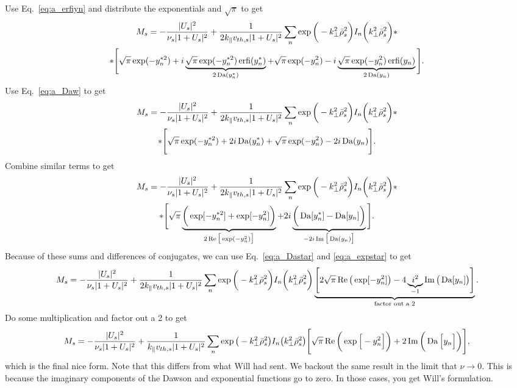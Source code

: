 Use Eq.~\ref{eq:a_erfiyn} and distribute the exponentials and $\sqrt{\pi}$ to get
\begin{multline}
	M_s = -\frac{|U_s|^2}{\nu_s|1+U_s|^2}
	+ \frac{1}{2 k_\parallel v_{th,s}|1+U_s|^2}  \sum_n
	\exp\bigg( - k_\perp^2 \bar{\rho}_s^2  \bigg)
	I_n\bigg( k_\perp^2 \bar{\rho}_s^2 \bigg)* \\
	* \Bigg[
	\sqrt{\pi}\exp ( -y_n^{*2})+i \underbrace{ \sqrt{\pi}\exp ( -y_n^{*2}) \operatorname{erfi}(y_n^*)}_{2 \operatorname{Da}(y_n^*)}
	+ 	\sqrt{\pi}\exp ( -y_n^{2})-i \underbrace{\sqrt{\pi}\exp ( -y_n^{2})\operatorname{erfi}(y_n) }_{2 \operatorname{Da}(y_n)}
	\Bigg].
\end{multline}
Use Eq.~\ref{eq:a_Daw} to get
\begin{multline}
	M_s = -\frac{|U_s|^2}{\nu_s|1+U_s|^2}
	+ \frac{1}{2 k_\parallel v_{th,s}|1+U_s|^2}  \sum_n
	\exp\bigg( - k_\perp^2 \bar{\rho}_s^2  \bigg)
	I_n\bigg( k_\perp^2 \bar{\rho}_s^2 \bigg)* \\
	* \Bigg[
	\sqrt{\pi}\exp ( -y_n^{*2})+ 2 i\operatorname{Da}(y_n^*)
	+ 	\sqrt{\pi}\exp ( -y_n^{2})- 2 i\operatorname{Da}(y_n)
	\Bigg].
\end{multline}
Combine similar terms to get
\begin{multline}
	M_s = -\frac{|U_s|^2}{\nu_s|1+U_s|^2}
	+ \frac{1}{2 k_\parallel v_{th,s}|1+U_s|^2}  \sum_n
	\exp\bigg( - k_\perp^2 \bar{\rho}_s^2  \bigg)
	I_n\bigg( k_\perp^2 \bar{\rho}_s^2 \bigg)* \\
	* \Bigg[
	\sqrt{\pi}\underbrace{\bigg( \exp[-y_n^{*2}] + \exp[-y_n^2]   \bigg)}_{2\operatorname{Re} \big[ \exp(-y_n^2) \big]}
	+ 2i \underbrace{ \bigg( \operatorname{Da}[y_n^*] - \operatorname{Da}[y_n]  \bigg)}_{-2i \operatorname{Im} \big[ \operatorname{Da}(y_n) \big]}
	\Bigg].
\end{multline}
Because of these sums and differences of conjugates, we can use Eq.~\ref{eq:a_Dastar} and \ref{eq:a_expstar} to get
\begin{equation}
	M_s = -\frac{|U_s|^2}{\nu_s|1+U_s|^2}
	+ \frac{1}{2 k_\parallel v_{th,s}|1+U_s|^2}  \sum_n
	\exp\bigg( - k_\perp^2 \bar{\rho}_s^2  \bigg)
	I_n\bigg( k_\perp^2 \bar{\rho}_s^2 \bigg)
	\underbrace{\Bigg[
	2\sqrt{\pi}\operatorname{Re} \big( \exp[-y_n^2] \big)
	-4\underbrace{i^2}_{-1} \operatorname{Im} \big( \operatorname{Da}[y_n] \big)
	\Bigg]}_{\text{factor out a }2}.
\end{equation}
Do some multiplication and factor out a 2 to get
\begin{equation}
	M_s = - \frac{|U_s|^2}{\nu_s |1+U_s|^2} 
		+ \frac{1}{k_\parallel v_{th,s} |1+U_s|^2}
		\sum_n \exp \big(-k_\perp^2 \bar{\rho}^2_s \big)
		I_n \big( k_\perp^2 \bar{\rho}^2_s \big)
		\Bigg[ \sqrt{\pi} \operatorname{Re}\bigg( \exp \Big[-y_n^2\Big] \bigg) + 2 \operatorname{Im} \bigg( \operatorname{Da}\Big[y_n\Big] \bigg)  \Bigg],
\end{equation}
which is the final nice form. Note that this differs from what Will had sent. We backout the same result in the limit that $\nu\rightarrow 0$. 
This is because the imaginary components of the Dawson and exponential functions go to zero.
In those cases, you get Will's formulation.


